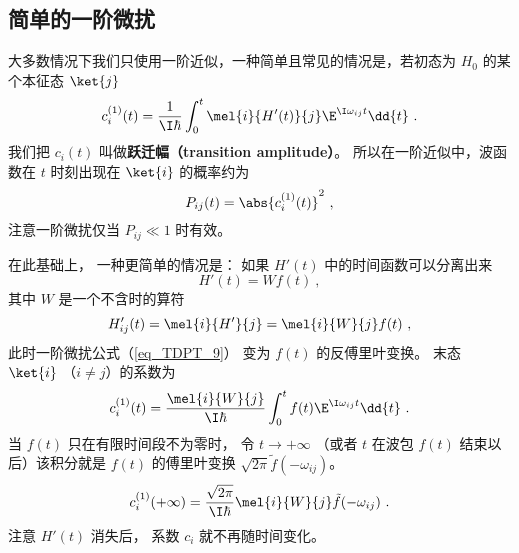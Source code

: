 \subsection{简单的一阶微扰}
大多数情况下我们只使用一阶近似，一种简单且常见的情况是，若初态为 $H_0$ 的某个本征态 $\ket{j}$
\begin{equation}\label{eq_TDPT_13}
c_i^{(1)}(t) = \frac{1}{\I\hbar} \int_0^t \mel{i}{H'(t)}{j} \E^{\I\omega_{ij} t} \dd{t}~.
\end{equation}
我们把 $c_i(t)$ 叫做\textbf{跃迁幅（transition amplitude）}。 所以在一阶近似中，波函数在 $t$ 时刻出现在 $\ket{i}$ 的概率约为
\begin{equation}
P_{ij}(t) = \abs{c_i^{(1)}(t)}^2~,
\end{equation}
注意一阶微扰仅当 $P_{ij} \ll 1$ 时有效。

在此基础上， 一种更简单的情况是： 如果 $H'(t)$ 中的时间函数可以分离出来
\begin{equation}
H'(t) = W f(t)~,
\end{equation}
其中 $W$ 是一个不含时的算符
\begin{equation}
H'_{ij}(t) = \mel{i}{H'}{j} = \mel{i}{W}{j}f(t)~,
\end{equation}
此时一阶微扰公式（\autoref{eq_TDPT_9}） 变为 $f(t)$ 的反傅里叶变换。 末态 $\ket{i}$ （$i \neq j$）的系数为
\begin{equation}
c_i^{(1)}(t) = \frac{\mel{i}{W}{j}}{\I\hbar} \int_0^t f(t)\E^{\I\omega_{ij} t} \dd{t}~.
\end{equation}
当 $f(t)$ 只在有限时间段不为零时， 令 $t\to+\infty$ （或者 $t$ 在波包 $f(t)$ 结束以后）该积分就是 $f(t)$ 的傅里叶变换 $\sqrt{2\pi}\tilde f(-\omega_{ij})$。
\begin{equation}\label{eq_TDPT_12}
c_i^{(1)}(+\infty) = \frac{\sqrt{2\pi}}{\I\hbar} \mel{i}{W}{j}\tilde f(-\omega_{ij})~.
\end{equation}
注意 $H'(t)$ 消失后， 系数 $c_i$ 就不再随时间变化。
